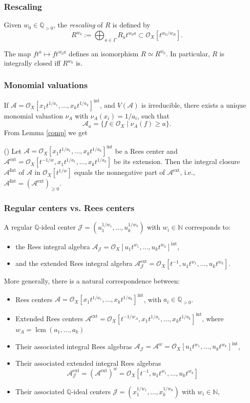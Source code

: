 \documentclass{amsart}
\newcommand{\QQ}{{\mathbb{Q}}}
\newcommand{\NN}{{\mathbb{N}}}
\newcommand{\cA}{{\mathcal A}}
\newcommand{\cJ}{{\mathcal J}}
\newcommand{\cO}{{\mathcal O}}
\newcommand{\Int}{{\operatorname{Int}}}
\newcommand{\ext}{{\operatorname{ext}}}
\newcommand{\lcm}{{\operatorname{lcm}}}
\newcommand{\inte}{{\operatorname{int}}}
\begin{document}
\subsubsection{Rescaling}
Given $w_0 \in \QQ_{>0}$, the \emph{rescaling} of $R$ is defined by
\[
R^{w_0} := \bigoplus_{a \in \Gamma} R_a t^{w_0 a} \subset \cO_X[t^{w_0 / w_R}].
\]

\begin{lemma}
The map $ft^a \mapsto ft^{w_0 a}$ defines an isomorphism $R \simeq R^{w_0}$. In particular, $R$ is integrally closed iff $R^{w_0}$ is.
\end{lemma}

\subsubsection{Monomial valuations}
If $\cA = \cO_X[x_1 t^{1/a_1}, \ldots, x_k t^{1/a_k}]^\inte$, and $V(\cA)$ is irreducible, there exists a unique monomial valuation $\nu_A$ with $\nu_A(x_i) = 1/a_i$, such that
\[
\cA_a = \{ f \in \cO_X \mid \nu_A(f) \geq a \}.
\]
From Lemma \ref{comp} we get
\begin{lemma}(\cite{W22})\label{comp3}
Let $\cA = \cO_X[ x_1 t^{1/a_1}, \ldots, x_k t^{1/a_k}]^\inte$ be a Rees center and $\cA^\ext = \cO_X[t^{-1/w}, x_1 t^{1/a_1}, \ldots, x_k t^{1/a_k}]$ be its extension. Then the integral closure $\cA^\Int$ of $\cA$ in $\cO_X[t^{1/w}]$ equals the nonnegative part of $\cA^\ext$, i.e., $\cA^\Int = (\cA^\ext)_{\geq 0}$.
\end{lemma}

\subsubsection{Regular centers vs. Rees centers}
A regular $\QQ$-ideal center $\cJ = (u_1^{1/w_1}, \ldots, u_k^{1/w_k})$ with $w_i \in \NN$ corresponds to:
\begin{itemize}
  \item the Rees integral algebra $\cA_\cJ = \cO_X[u_1 t^{w_1}, \ldots, u_k t^{w_k}]^\inte$,
  \item and the extended Rees integral algebra $\cA_\cJ^\ext = \cO_X[t^{-1}, u_1 t^{w_1}, \ldots, u_k t^{w_k}]$.
\end{itemize}

More generally, there is a natural correspondence between:
\begin{itemize}
\item Rees centers $\cA=\cO_X[x_1 t^{1/a_1}, \ldots, x_k t^{1/a_k}]^\inte$, with $a_i\in \QQ_{>0}$.
\item Extended Rees centers  $\cA^{\ext}=\cO_X[t^{-1/w_A},x_1 t^{1/a_1}, \ldots, x_k t^{1/a_k}]^\inte$, where $w_A=\lcm(a_1,\ldots,a_k)$
\item Their associated integral Rees algebras $\cA_\cJ=\cA^w=\cO_X[u_1 t^{w_1}, \ldots, u_k t^{w_k}]^\inte$,
\item  Their associated extended integral Rees algebras $$\cA_\cJ^\ext=(\cA^{\ext})^w= \cO_X[t^{-1}, u_1 t^{w_1}, \ldots, u_k t^{w_k}]$$
\item Their associated $\QQ$-ideal centers $\cJ = (x_1^{1/w_1}, \ldots, x_k^{1/w_k})$ with $w_i \in \NN$,
\end{itemize}
\end{document}
